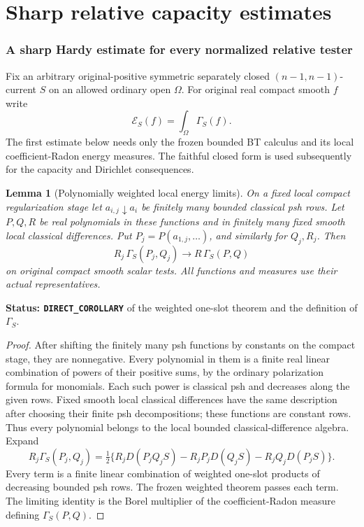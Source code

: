 \documentclass[11pt,a4paper]{article}
\numberwithin{equation}{section}
\newtheorem{lemma}[theorem]{Lemma}
\theoremstyle{definition}
\theoremstyle{remark}
\begin{document}


\part{Sharp relative capacity estimates}

\section{A sharp Hardy estimate for every normalized relative tester}
\label{sec:r6-sharp-relative-hardy}

Fix an arbitrary original-positive symmetric separately closed
$(n-1,n-1)$-current $S$ on an allowed ordinary open $\Omega$.
For original real compact smooth $f$ write
\[
                    \mathcal E_S(f)=\int_\Omega\Gamma_S(f).
\]
The first estimate below needs only the frozen bounded BT calculus and
its local coefficient-Radon energy measures. The faithful closed form
is used subsequently for the capacity and Dirichlet consequences.

\begin{lemma}[Polynomially weighted local energy limits]
\label{lem:r6-polynomial-weighted-energy-limit}
On a fixed local compact regularization stage let
$a_{i,j}\downarrow a_i$ be finitely many bounded classical psh rows.
Let $P,Q,R$ be real polynomials in these functions and in finitely many
fixed smooth local classical differences. Put $P_j=P(a_{1,j},\ldots)$,
and similarly for $Q_j,R_j$. Then
\[
            R_j\,\Gamma_S(P_j,Q_j)
                    \longrightarrow R\,\Gamma_S(P,Q)
\]
on original compact smooth scalar tests. All functions and measures
use their actual representatives.
\end{lemma}

\noindent\textbf{Status: \texttt{DIRECT\_COROLLARY}} of the weighted
one-slot theorem and the definition of $\Gamma_S$.

\begin{proof}
After shifting the finitely many psh functions by constants on the
compact stage, they are nonnegative. Every polynomial in them is a
finite real linear combination of powers of their positive sums, by
the ordinary polarization formula for monomials. Each such power is
classical psh and decreases along the given rows. Fixed smooth local
classical differences have the same description after choosing their
finite psh decompositions; these functions are constant rows.
Thus every polynomial belongs to the local bounded classical-difference
algebra. Expand
\[
 R_j\Gamma_S(P_j,Q_j)
  =\tfrac12\{R_jD(P_jQ_jS)-R_jP_jD(Q_jS)-R_jQ_jD(P_jS)\}.
\]
Every term is a finite linear combination of weighted one-slot products
of decreasing bounded psh rows. The frozen weighted theorem passes
each term. The limiting identity is the Borel multiplier of the
coefficient-Radon measure defining $\Gamma_S(P,Q)$.
\end{proof}
\end{document}
